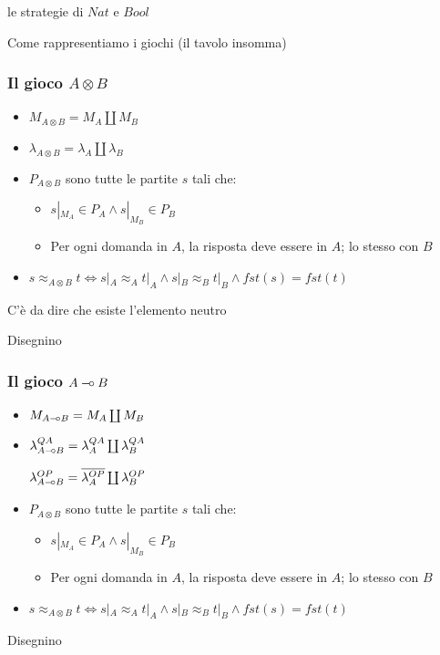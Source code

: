 \documentclass{beamer}
\newcommand{\limp}{\mathbin{{-}\mkern-3.5mu{\circ}}}
\begin{document}
\begin{frame}
	
	\begin{example}
		le strategie di $Nat$ e $Bool$
	\end{example}
	
\end{frame}

\begin{frame}
	
	Come rappresentiamo i giochi (il tavolo insomma)
	
\end{frame}

\begin{frame}
	
	\frametitle{Il gioco $A \otimes B$}
	
	\begin{itemize}
		\item $M_{A\otimes B}=M_A \coprod M_B$
		\item $\lambda_{A\otimes B}=\lambda_A \coprod \lambda_B$
		\item $P_{A\otimes B}$ sono tutte le partite $s$ tali che:
		\begin{itemize}
			\item $s|_{M_A} \in P_A \wedge s|_{M_B} \in P_B$
			\item Per ogni domanda in $A$, la risposta deve essere in $A$; lo stesso con $B$
		\end{itemize}
		\item $s\approx_{A\otimes B} t \Leftrightarrow s|_A \approx_A t|_A \wedge s|_B \approx_B t|_B \wedge fst(s)=fst(t)$ 
	\end{itemize}
	
	C'è da dire che esiste l'elemento neutro	
	
	Disegnino
	
\end{frame}


\begin{frame}
	
	\frametitle{Il gioco $A \limp B$}
	
	\begin{itemize}
		\item $M_{A\limp B}=M_A \coprod M_B$
		\item $\lambda^{QA}_{A\limp B}=\lambda^{QA}_A \coprod \lambda^{QA}_B$
		
		$\lambda^{OP}_{A\limp B}=\overline{\lambda^{OP}_A} \coprod \lambda^{OP}_B$
		\item $P_{A\otimes B}$ sono tutte le partite $s$ tali che:
		\begin{itemize}
			\item $s|_{M_A} \in P_A \wedge s|_{M_B} \in P_B$
			\item Per ogni domanda in $A$, la risposta deve essere in $A$; lo stesso con $B$
		\end{itemize}
		\item $s\approx_{A\otimes B} t \Leftrightarrow s|_A \approx_A t|_A \wedge s|_B \approx_B t|_B \wedge fst(s)=fst(t)$ 
	\end{itemize}
	
	Disegnino
	
\end{frame}
\end{document}
